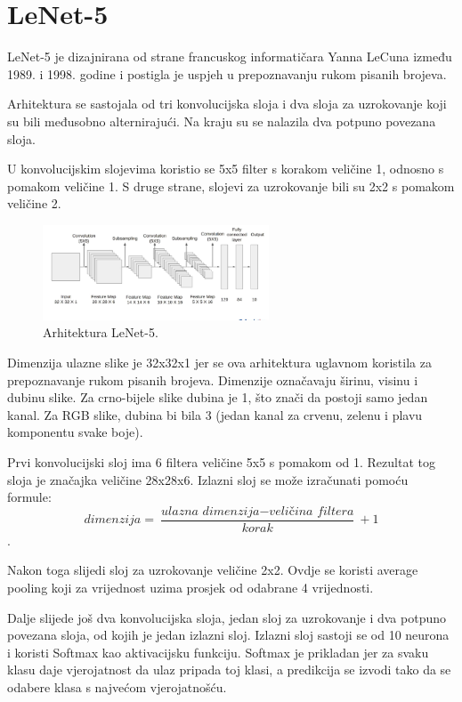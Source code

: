 \section{LeNet-5}\label{sec:lenet-5}
LeNet-5 je dizajnirana od strane francuskog informatičara Yanna LeCuna između 1989. i 1998. godine i postigla je uspjeh u prepoznavanju rukom pisanih brojeva.

Arhitektura se sastojala od tri konvolucijska sloja i dva sloja za uzrokovanje koji su bili međusobno alternirajući. Na kraju su se nalazila dva potpuno povezana sloja.

U konvolucijskim slojevima koristio se 5x5 filter s korakom veličine 1, odnosno s pomakom veličine 1. S druge strane, slojevi za uzrokovanje bili su 2x2 s pomakom veličine 2.
\begin{figure}[h]
    \centering
    \includegraphics[width=0.6\textwidth]{images/LeNet}
    \caption{Arhitektura LeNet-5.}
    \label{fig:slika8}
\end{figure}
Dimenzija ulazne slike je 32x32x1 jer se ova arhitektura uglavnom koristila za prepoznavanje rukom pisanih brojeva. Dimenzije označavaju širinu, visinu i dubinu slike. Za crno-bijele slike dubina je 1, što znači da postoji samo jedan kanal. Za RGB slike, dubina bi bila 3 (jedan kanal za crvenu, zelenu i plavu komponentu svake boje).

Prvi konvolucijski sloj ima 6 filtera veličine 5x5 s pomakom od 1.
Rezultat tog sloja je značajka veličine 28x28x6.
Izlazni sloj se može izračunati pomoću formule: \[ \textit{dimenzija} = \frac{\textit{ulazna dimenzija} - \textit{veličina filtera}}{\textit{korak}} + 1 \].

Nakon toga slijedi sloj za uzrokovanje veličine 2x2.
Ovdje se koristi average pooling koji za vrijednost uzima prosjek od odabrane 4 vrijednosti.

Dalje slijede još dva konvolucijska sloja, jedan sloj za uzrokovanje i dva potpuno povezana sloja, od kojih je jedan izlazni sloj.
Izlazni sloj sastoji se od 10 neurona i koristi Softmax kao aktivacijsku funkciju.
Softmax je prikladan jer za svaku klasu daje vjerojatnost da ulaz pripada toj klasi, a predikcija se izvodi tako da se odabere klasa s najvećom vjerojatnošću.

